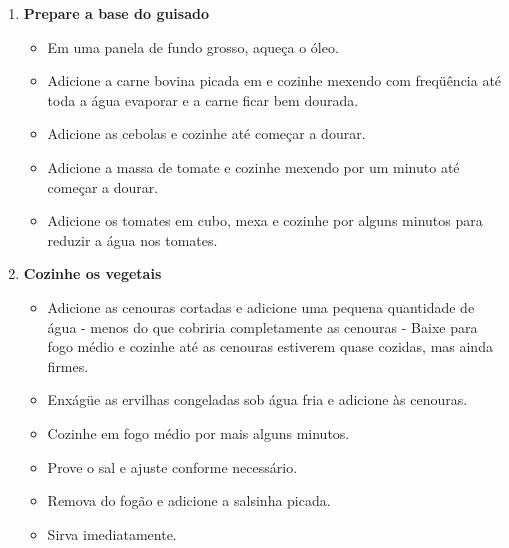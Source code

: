 \documentclass [11pt, letterpaper] {article}
\begin{document}
\begin {description}
\begin {enumerate}
\item {\bf Prepare a base do guisado}
\begin {itemize}
\item Em uma panela de fundo grosso, aque\c{c}a o óleo.
\item Adicione a carne bovina picada em e cozinhe mexendo com freqüência até toda a \'agua evaporar e a carne ficar bem dourada. 
\item Adicione as cebolas e cozinhe até começar a dourar.
\item Adicione a massa de tomate e cozinhe mexendo por um minuto até começar a dourar.
\item Adicione os tomates em cubo, mexa e cozinhe por alguns minutos para reduzir a água nos tomates.
\end {itemize}

\item {\bf Cozinhe os vegetais}
\begin {itemize}
\item Adicione as cenouras cortadas e adicione uma pequena quantidade de água - menos do que cobriria completamente as cenouras - Baixe para fogo médio e cozinhe até as cenouras estiverem quase cozidas, mas ainda firmes.
\item Enxágüe as ervilhas congeladas sob água fria e adicione \`as cenouras.
\item Cozinhe em fogo médio por mais alguns minutos.
\item Prove o sal e ajuste conforme necessário.
\item Remova do fogão e adicione a salsinha picada.
\item Sirva imediatamente.
\end {itemize}
\end {enumerate}
\end {description}
\end{document}
